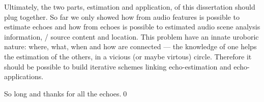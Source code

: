 Ultimately, the two parts, estimation and application, of this dissertation should plug together.
So far we only showed how from audio features is possible to estimate echoes and how from echoes is possible to estimated audio scene analysis information, \eg/ source content and location.
This problem have an innate uroboric nature: where, what, when and how are connected --- the knowledge of one helps the estimation of the others, in a vicious (or maybe virtous) circle.
Therefore it should be possible to build iterative schemes linking echo-estimation and echo-applications.

\mynewline
So long and thanks for all the echoes.\qed
